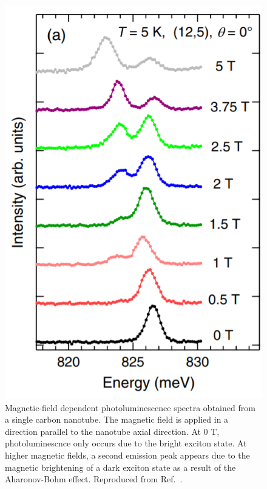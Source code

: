 \begin{figure}[ht]
	\centering
	\includegraphics[scale=0.5]{images/chapter_optical_props/dark_brightening_srivastava}
	\caption{Magnetic-field dependent photoluminescence spectra obtained from a single carbon nanotube. The magnetic field is applied in a direction parallel to the nanotube axial direction. At 0 T, photoluminescnce only occurs due to the bright exciton state. At higher magnetic fields, a second emission peak appears due to the magnetic brightening of a dark exciton state as a result of the Aharonov-Bohm effect.  Reproduced from Ref.\ \cite{srivastava2008direct}.}
	\label{fig:exciton_brightening}
\end{figure}


%


